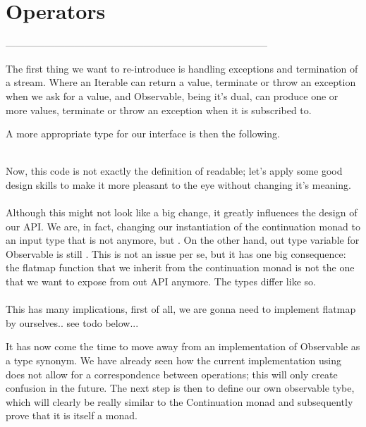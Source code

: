 \section{Operators}

--------------------------------------------------------------------------------

The first thing we want to re-introduce is handling exceptions and termination of a stream. Where an Iterable can return a value, terminate or throw an exception when we ask for a value, and Observable, being it's dual, can produce one or more values, terminate or throw an exception when it is subscribed to. 

A more appropriate type for our interface is then the following.\\

\\


Now, this code is not exactly the definition of readable; let's apply some good design skills to make it more pleasant to the eye without changing it's meaning.\\

\\

Although this might not look like a big change, it greatly influences the design of our API. We are, in fact, changing our instantiation of the continuation monad to an input type that is not  anymore, but . On the other hand, out type variable for Observable is still . This is not an issue per se, but it has one big consequence: the flatmap function that we inherit from the continuation monad is not the one that we want to expose from out API anymore. The types differ like so.\\

\\

This has many implications, first of all, we are gonna need to implement flatmap by ourselves.. see todo below...

It has now come the time to move away from an implementation of Observable as a type synonym. We have already seen how the current implementation using  does not allow for a correspondence between \code{>>=} operations; this will only create confusion in the future. The next step is then to define our own observable tybe, which will clearly be really similar to the Continuation monad and subsequently prove that it is itself a monad. 

